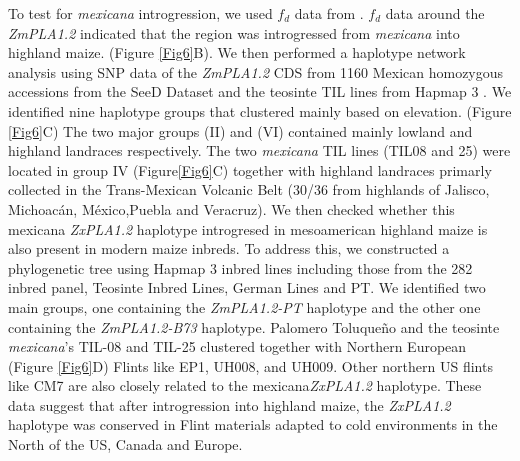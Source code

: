 \documentclass[9pt,twocolumn,twoside,lineno]{BioRxiv}
\begin{document}
To test for \textit{mexicana} introgression, we used \(f_d\) data from \cite{Gonzalez-Segovia2019-jy}.
\(f_d\) data around the \textit{ZmPLA1.2} indicated that the region was introgressed from \textit{mexicana} into highland maize. (Figure \ref{Fig6}B).
We then performed a haplotype network analysis using SNP data of the \textit{ZmPLA1.2} CDS from 1160 Mexican homozygous accessions from the SeeD Dataset \cite{Romero_Navarro2017-cn} and the teosinte TIL lines from Hapmap 3 \cite{Bukowski2017-ng}.   
We identified nine haplotype groups that clustered mainly based on elevation. (Figure \ref{Fig6}C) 
The two major groups (II) and (VI) contained mainly lowland and highland landraces respectively. 
The two \textit{mexicana} TIL lines (TIL08 and 25) were located in group IV  (Figure\ref{Fig6}C) together with highland landraces primarly collected in the Trans-Mexican Volcanic Belt (30/36 from highlands of Jalisco, Michoacán, México,Puebla and Veracruz).
We then checked whether this mexicana \textit{ZxPLA1.2} haplotype introgresed in mesoamerican highland maize is also present in modern maize inbreds. 
To address this, we constructed a phylogenetic tree using Hapmap 3 inbred lines including those from the 282 inbred panel, Teosinte Inbred Lines, German Lines and PT. 
We identified two main groups, one containing the \textit{ZmPLA1.2-PT} haplotype and the other one containing the \textit{ZmPLA1.2-B73} haplotype.
Palomero Toluqueño and the teosinte \textit{mexicana}'s TIL-08 and TIL-25 clustered together with Northern European (Figure \ref{Fig6}D) Flints like EP1, UH008, and UH009. 
Other northern US flints like CM7 are also closely related to the mexicana\textit{ZxPLA1.2} haplotype. 
These data suggest that after introgression into highland maize, the \textit{ZxPLA1.2} haplotype was conserved in Flint materials adapted to cold environments in the North of the US, Canada and Europe. 
\end{document}
